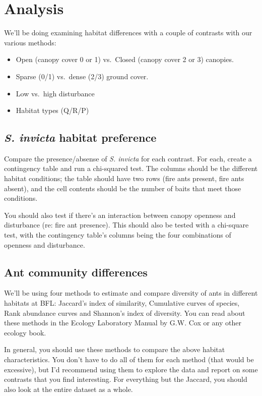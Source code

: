 \documentclass[]{book}
\providecommand{\tightlist}{%
  \setlength{\itemsep}{0pt}\setlength{\parskip}{0pt}}
\begin{document}
\section{Analysis}\label{analysis-2}

We'll be doing examining habitat differences with a couple of contrasts
with our various methods:

\begin{itemize}
\tightlist
\item
  Open (canopy cover 0 or 1) vs.~Closed (canopy cover 2 or 3) canopies.
\item
  Sparse (0/1) vs.~dense (2/3) ground cover.
\item
  Low vs.~high disturbance
\item
  Habitat types (Q/R/P)
\end{itemize}

\subsection{\texorpdfstring{\emph{S. invicta} habitat
preference}{S. invicta habitat preference}}\label{s.-invicta-habitat-preference}

Compare the presence/absense of \emph{S. invicta} for each contrast. For
each, create a contingency table and run a chi-squared test. The columns
should be the different habitat conditions; the table should have two
rows (fire ants present, fire ants absent), and the cell contents should
be the number of baits that meet those conditions.

You should also test if there's an interaction between canopy openness
and disturbance (re: fire ant presence). This should also be tested with
a chi-square test, with the contingency table's columns being the four
combinations of openness and disturbance.

\subsection{Ant community differences}\label{ant-community-differences}

We'll be using four methods to estimate and compare diversity of ants in
different habitats at BFL: Jaccard's index of similarity, Cumulative
curves of species, Rank abundance curves and Shannon's index of
diversity. You can read about these methods in the Ecology Laboratory
Manual by G.W. Cox or any other ecology book.

In general, you should use these methods to compare the above habitat
characteristics. You don't have to do all of them for each method (that
would be excessive), but I'd recommend using them to explore the data
and report on some contrasts that you find interesting. For everything
but the Jaccard, you should also look at the entire dataset as a whole.~
\end{document}
